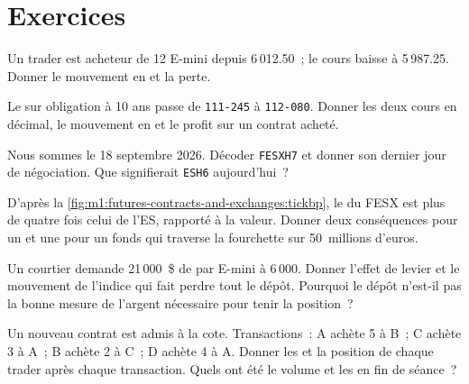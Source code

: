 \section{Exercices}

\begin{exercise}[$\star$]\label{exo:m1:futures-contracts-and-exchanges:1}
Un trader est acheteur de 12 E-mini depuis 6\,012.50~; le cours baisse à 5\,987.25. Donner
le mouvement en  et la perte.
\end{exercise}

\begin{exercise}[$\star$]\label{exo:m1:futures-contracts-and-exchanges:2}
Le  sur obligation à 10 ans passe de \texttt{111-245} à \texttt{112-080}. Donner
les deux cours en décimal, le mouvement en  et le profit sur un
contrat acheté.
\end{exercise}

\begin{exercise}[$\star$]\label{exo:m1:futures-contracts-and-exchanges:3}
Nous sommes le 18 septembre 2026. Décoder \texttt{FESXH7} et donner son dernier jour de
négociation. Que signifierait \texttt{ESH6} aujourd'hui~?
\end{exercise}

\begin{exercise}[$\star\star$]\label{exo:m1:futures-contracts-and-exchanges:4}
D'après la \cref{fig:m1:futures-contracts-and-exchanges:tickbp}, le  du FESX est
plus de quatre fois celui de l'ES, rapporté à la valeur. Donner deux conséquences
pour un  et une pour un fonds qui traverse la fourchette sur 50~millions d'euros.
\end{exercise}

\begin{exercise}[$\star\star$]\label{exo:m1:futures-contracts-and-exchanges:5}
Un courtier demande 21\,000~\$ de  par E-mini à 6\,000. Donner
l'effet de levier et le mouvement de l'indice qui fait perdre tout le dépôt.
Pourquoi le dépôt n'est-il pas la bonne mesure de l'argent nécessaire pour tenir la position~?
\end{exercise}

\begin{exercise}[$\star\star$]\label{exo:m1:futures-contracts-and-exchanges:6}
Un nouveau contrat est admis à la cote. Transactions~: A achète 5 à B~; C achète 3 à A~; B achète 2
à C~; D achète 4 à A. Donner les  et la position de chaque trader
après chaque transaction. Quels ont été le volume et les  en fin de séance~?
\end{exercise}

